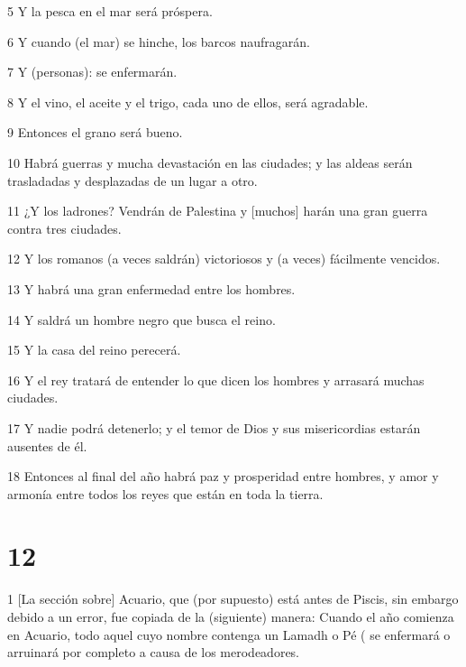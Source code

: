\par 5 Y la pesca en el mar será próspera.

\par 6 Y cuando (el mar) se hinche, los barcos naufragarán.

\par 7 Y (personas): se enfermarán.

\par 8 Y el vino, el aceite y el trigo, cada uno de ellos, será agradable.

\par 9 Entonces el grano será bueno.

\par 10 Habrá guerras y mucha devastación en las ciudades; y las aldeas serán trasladadas y desplazadas de un lugar a otro.

\par 11 ¿Y los ladrones? Vendrán de Palestina y [muchos] harán una gran guerra contra tres ciudades.

\par 12 Y los romanos (a veces saldrán) victoriosos y (a veces) fácilmente vencidos.

\par 13 Y habrá una gran enfermedad entre los hombres.

\par 14 Y saldrá un hombre negro que busca el reino.

\par 15 Y la casa del reino perecerá.

\par 16 Y el rey tratará de entender lo que dicen los hombres y arrasará muchas ciudades.

\par 17 Y nadie podrá detenerlo; y el temor de Dios y sus misericordias estarán ausentes de él.

\par 18 Entonces al final del año habrá paz y prosperidad entre hombres, y amor y armonía entre todos los reyes que están en toda la tierra.

\chapter{12}

\par 1 [La sección sobre] Acuario, que (por supuesto) está antes de Piscis, sin embargo debido a un error, fue copiada de la (siguiente) manera: Cuando el año comienza en Acuario, todo aquel cuyo nombre contenga un Lamadh o Pé ( se enfermará o arruinará por completo a causa de los merodeadores.


